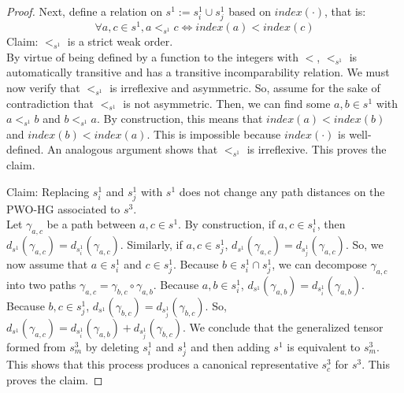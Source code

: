 \documentclass{article}
\theoremstyle{plain}
\theoremstyle{definition}
\theoremstyle{remark}
\begin{document}
\begin{proof}
	Next, define a relation on $s^1 := s^1_i \cup s^1_j$ based on $index(\cdot)$, that is:
	\begin{equation*}
		\forall a, c \in s^1, a <_{s^1} c \iff index(a) < index(c)
	\end{equation*}
	Claim: $<_{s^1}$ is a strict weak order.\\
	By virtue of being defined by a function to the integers with $<$, $<_{s^1}$ is automatically transitive and has a transitive incomparability relation. We must now verify that $<_{s^1}$ is irreflexive and asymmetric. So, assume for the sake of contradiction that $<_{s^1}$ is not asymmetric. Then, we can find some $a, b \in s^1$ with $a <_{s^1} b$ and $b <_{s^1} a$. By construction, this means that $index(a) < index(b)$ and $index(b) < index(a)$. This is impossible because $index(\cdot)$ is well-defined. An analogous argument shows that $<_{s^1}$ is irreflexive. This proves the claim.
	
	Claim: Replacing $s^1_i$ and $s^1_j$ with $s^1$ does not change any path distances on the PWO-HG associated to $s^3$.\\
	Let $\gamma_{a, c}$ be a path between $a, c \in s^1$. By construction, if $a, c \in s^1_i$, then $d_{s^1}(\gamma_{a, c}) = d_{s^1_i}(\gamma_{a, c})$. Similarly, if $a, c \in s^1_j$, $d_{s^1}(\gamma_{a, c}) = d_{s^1_j}(\gamma_{a, c})$. So, we now assume that $a \in s^1_i$ and $c \in s^1_j$. Because $b \in s^1_i \cap s^1_j$, we can decompose $\gamma_{a, c}$ into two paths $\gamma_{a, c} = \gamma_{b, c} \circ \gamma_{a, b}$. Because $a, b \in s^1_i$, $d_{s^1}(\gamma_{a, b}) = d_{s^1_i}(\gamma_{a, b})$. Because $b, c \in s^1_j$, $d_{s^1}(\gamma_{b, c}) = d_{s^1_j}(\gamma_{b, c})$. So, $d_{s^1}(\gamma_{a, c}) = d_{s^1_i}(\gamma_{a, b}) + d_{s^1_j}(\gamma_{b, c})$. We conclude that the generalized tensor formed from $s^3_m$ by deleting $s^1_i$ and $s^1_j$ and then adding $s^1$ is equivalent to $s^3_m$. This shows that this process produces a canonical representative $s^3_c$ for $s^3$. This proves the claim.
	

\end{proof}
\end{document}
